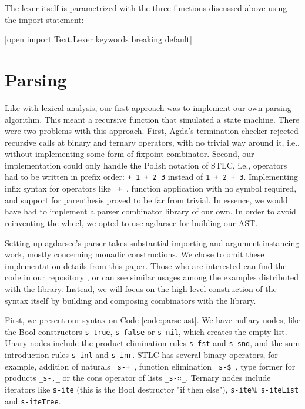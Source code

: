 The lexer itself is parametrized with the three functions discussed above using the import statement:

|open import Text.Lexer keywords breaking default|

\section{Parsing}

Like with lexical analysis, our first approach was to implement our own parsing algorithm. This meant a recursive function that simulated a state machine. There were two problems with this approach. First, Agda's termination checker rejected recursive calls at binary and ternary operators, with no trivial way around it, i.e., without implementing some form of fixpoint combinator. Second, our implementation could only handle the Polish notation of STLC, i.e., operators had to be written in prefix order: \verb$+ 1 + 2 3$ instead of \verb$1 + 2 + 3$. Implementing infix syntax for operators like \verb$_+_$, function application with no symbol required, and support for parenthesis proved to be far from trivial. In essence, we would have had to implement a parser combinator library of our own. In order to avoid reinventing the wheel, we opted to use agdarsec for building our AST.

Setting up agdarsec's parser takes substantial importing and argument instancing work, mostly concerning monadic constructions. We chose to omit these implementation details from this paper. Those who are interested can find the code in our repository \cite{home-repo}, or can see similar usages among the examples distributed with the library. Instead, we will focus on the high-level construction of the syntax itself by building and composing combinators with the library.

First, we present our syntax on Code \ref{code:parse-ast}. We have nullary nodes, like the Bool constructors \verb$s-true$, \verb$s-false$ or \verb$s-nil$, which creates the empty list. Unary nodes include the product elimination rules \verb$s-fst$ and \verb$s-snd$, and the sum introduction rules \verb$s-inl$ and \verb$s-inr$. STLC has several binary operators, for example, addition of naturals \verb$_s-+_$, function elimination \verb$_s-$\verb=$=\verb$_$, type former for products \verb$_s-,_$ or the cons operator of lists \verb$_s-∷_$. Ternary nodes include iterators like \verb$s-ite$ (this is the Bool destructor "if then else"), \verb$s-iteℕ$, \verb$s-iteList$ and \verb$s-iteTree$.


